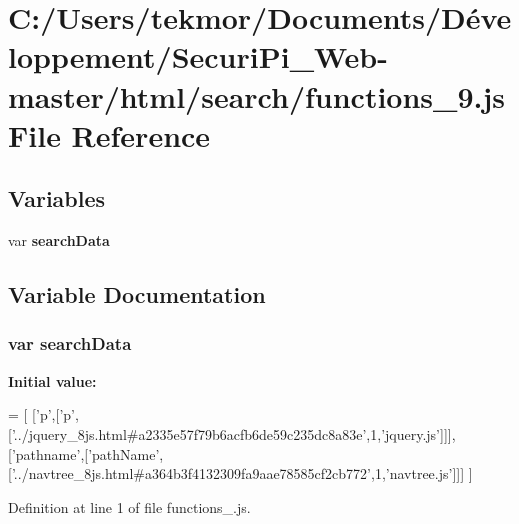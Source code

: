 \section{C\+:/\+Users/tekmor/\+Documents/\+Développement/\+Securi\+Pi\+\_\+\+Web-\/master/html/search/functions\+\_\+9.js File Reference}
\label{functions__9_8js}
\subsection*{Variables}
\begin{DoxyCompactItemize}
\item 
var {\bf search\+Data}
\end{DoxyCompactItemize}


\subsection{Variable Documentation}
\subsubsection[{search\+Data}]{\setlength{\rightskip}{0pt plus 5cm}var search\+Data}\label{functions__9_8js_ad01a7523f103d6242ef9b0451861231e}
{\bfseries Initial value\+:}
\begin{DoxyCode}
=
[
  [\textcolor{charliteral}{'p'},[\textcolor{charliteral}{'p'},[\textcolor{stringliteral}{'../jquery\_8js.html#a2335e57f79b6acfb6de59c235dc8a83e'},1,\textcolor{stringliteral}{'jquery.js'}]]],
  [\textcolor{stringliteral}{'pathname'},[\textcolor{stringliteral}{'pathName'},[\textcolor{stringliteral}{'../navtree\_8js.html#a364b3f4132309fa9aae78585cf2cb772'},1,\textcolor{stringliteral}{'navtree.js'}]]]
]
\end{DoxyCode}


Definition at line 1 of file functions\+\_.\+js.

